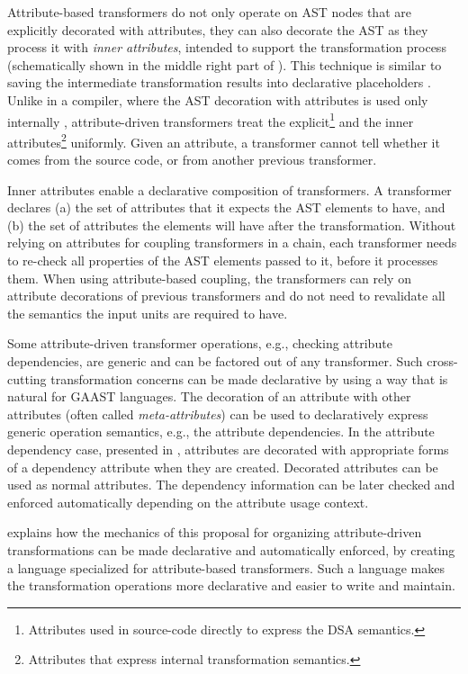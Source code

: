 Attribute-based transformers do not only operate on AST nodes that are explicitly decorated with attributes, they can also decorate the AST as they process it with \textit{inner attributes}, intended to support the transformation process (schematically shown in the middle right part of ). This technique is similar to saving the intermediate transformation results into declarative placeholders \cite{asfsdf.02}. Unlike in a compiler, where the AST decoration with attributes is used only internally \cite{java.compilers.book}, attribute-driven transformers treat the explicit\footnote{Attributes used in source-code directly to express the DSA semantics.} and the inner attributes\footnote{Attributes that express internal transformation semantics.} uniformly. Given an attribute, a transformer cannot tell whether it comes from the source code, or from another previous transformer. 

Inner attributes enable a declarative composition of transformers. A transformer declares (a) the set of attributes that it expects the AST elements to have, and (b) the set of attributes the elements will have after the transformation. Without relying on attributes for coupling transformers in a chain, each transformer needs to re-check all properties of the AST elements passed to it, before it processes them. When using attribute-based coupling, the transformers can rely on attribute decorations of previous transformers and do not need to revalidate all the semantics the input units are required to have. 

Some attribute-driven transformer operations, e.g., checking attribute dependencies, are generic and can be factored out of any transformer. Such cross-cutting transformation concerns can be made declarative by using a way that is natural for GAAST languages. The decoration of an attribute with other attributes (often called \textit{meta-attributes}) can be used to declaratively express generic operation semantics, e.g., the attribute dependencies. In the attribute dependency case, presented in , attributes are decorated with appropriate forms of a dependency attribute when they are created. Decorated attributes can be used as normal attributes. The dependency information can be later checked and enforced automatically depending on the attribute usage context.

 explains how the mechanics of this proposal for organizing attribute-driven transformations can be made declarative and automatically enforced, by creating a language specialized for attribute-based transformers. Such a language makes the transformation operations more declarative and easier to write and maintain.   

